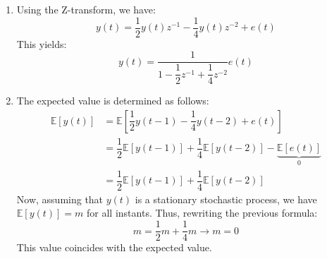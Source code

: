 \begin{enumerate}
    \item Using the Z-transform, we have:
        \[y(t)=\dfrac{1}{2}y(t)z^{-1}-\dfrac{1}{4}y(t)z^{-2}+e(t)\]
        This yields:
        \[y(t)=\dfrac{1}{1-\dfrac{1}{2}z^{-1}+\dfrac{1}{4}z^{-2}}e(t)\]
    \item The expected value is determined as follows:
        \begin{align*}
            \mathbb{E}\left[y(t)\right]     &= \mathbb{E}\left[\dfrac{1}{2}y(t-1)-\dfrac{1}{4}y(t-2)+e(t)\right] \\
                                            &= \dfrac{1}{2}\mathbb{E}\left[y(t-1)\right] +\dfrac{1}{4}\mathbb{E}\left[y(t-2)\right]-\underbrace{\mathbb{E}\left[e(t)\right]}_0 \\
                                            &= \dfrac{1}{2}\mathbb{E}\left[y(t-1)\right] +\dfrac{1}{4}\mathbb{E}\left[y(t-2)\right]
        \end{align*}
        Now, assuming that $y(t)$ is a stationary stochastic process, we have $\mathbb{E}\left[y(t)\right]=m$ for all instants. 
        Thus, rewriting the previous formula:
        \[m=\dfrac{1}{2}m +\dfrac{1}{4}m\rightarrow m=0\]
        This value coincides with the expected value.


\end{enumerate}
